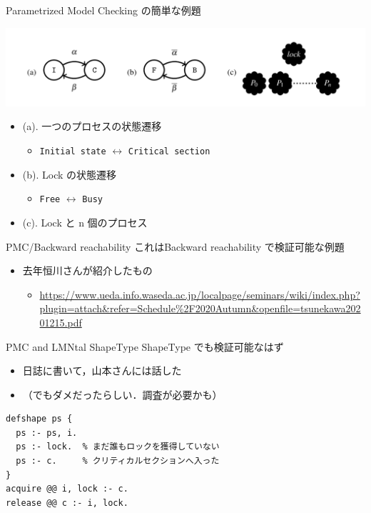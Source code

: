 \documentclass[presentation, xetex]{beamer}
\begin{document}
\begin{frame}[label={sec:orgc499298},fragile]{Parametrized Model Checking の簡単な例題}
 \begin{center}
\includegraphics[width=.9\linewidth]{./images/simple-mutex.png}
\end{center}

\begin{itemize}
\item (a). 一つのプロセスの状態遷移
\begin{itemize}
\item \texttt{Initial state} \(\longleftrightarrow\) \texttt{Critical section}
\end{itemize}
\item (b). Lock の状態遷移
\begin{itemize}
\item \texttt{Free} \(\longleftrightarrow\) \texttt{Busy}
\end{itemize}
\item (c). Lock と n 個のプロセス
\end{itemize}
\end{frame}



\begin{frame}[label={sec:org243c4d9}]{PMC/Backward reachability}
これはBackward reachability で検証可能な例題
\begin{itemize}
\item 去年恒川さんが紹介したもの
\begin{itemize}
\item \url{https://www.ueda.info.waseda.ac.jp/localpage/seminars/wiki/index.php?plugin=attach\&refer=Schedule\%2F2020Autumn\&openfile=tsunekawa20201215.pdf}
\end{itemize}
\end{itemize}
\end{frame}



\begin{frame}[label={sec:org94a8444},fragile]{PMC and LMNtal ShapeType}
 ShapeType でも検証可能なはず
\begin{itemize}
\item 日誌に書いて，山本さんには話した
\item （でもダメだったらしい．調査が必要かも）
\end{itemize}


\begin{verbatim}
defshape ps {
  ps :- ps, i.
  ps :- lock.  % まだ誰もロックを獲得していない
  ps :- c.     % クリティカルセクションへ入った
}
acquire @@ i, lock :- c.
release @@ c :- i, lock.
\end{verbatim}
\end{frame}
\end{document}
